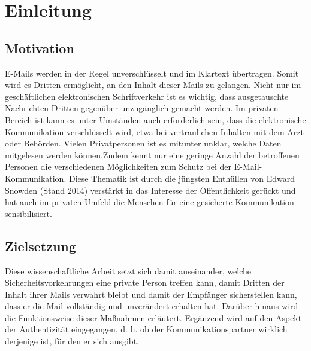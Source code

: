 \documentclass  [paper=a4,
				fontsize=12pt,
				listof=totoc,
				bibliography=totoc
				]{scrreprt}
\begin{document}
	\parindent 0pt %
	
	\pagebreak	%
  \pagestyle{plain}
  \tableofcontents
	\listoffigures %
	\pagebreak
	\listoftables %
	\pagebreak
	\pagebreak
	\setcounter{page}{1} %
		\pagestyle{fancyplain}
		\fancyhf{}							%
		\renewcommand{\headrulewidth}{0.4pt}
		\footskip =30pt
		\renewcommand{\chaptermark}[1]{\markboth{#1}{}}	%
		\rhead{\nouppercase{\leftmark}}	
		\cfoot{\thepage\ / \pageref{LastPage}}

\chapter{Einleitung}
		\section{Motivation}
		E-Mails werden in der Regel unverschlüsselt und im Klartext übertragen. Somit wird es Dritten ermöglicht, an den Inhalt dieser Mails zu gelangen. Nicht nur im geschäftlichen elektronischen Schriftverkehr ist es wichtig, dass ausgetauschte Nachrichten Dritten gegenüber unzugänglich gemacht werden. Im privaten Bereich ist kann es unter Umständen auch erforderlich sein, dass die elektronische Kommunikation verschlüsselt wird, etwa bei vertraulichen Inhalten mit dem Arzt oder Behörden. Vielen Privatpersonen ist es mitunter unklar, welche Daten mitgelesen werden können.Zudem kennt nur eine geringe Anzahl der betroffenen Personen die verschiedenen Möglichkeiten zum Schutz bei der E-Mail-Kommunikation. Diese Thematik ist durch die jüngsten Enthüllen von Edward Snowden (Stand 2014) verstärkt in das Interesse der Öffentlichkeit gerückt und hat auch im privaten Umfeld die Menschen für eine gesicherte Kommunikation sensibilisiert.
		\section{Zielsetzung}
		Diese wissenschaftliche Arbeit setzt sich damit auseinander, welche Sicherheitsvorkehrungen eine private Person treffen kann, damit Dritten der Inhalt ihrer Mails verwahrt bleibt und damit der Empfänger sicherstellen kann, dass er die Mail vollständig und unverändert erhalten hat. Darüber hinaus wird die Funktionsweise dieser Maßnahmen erläutert. Ergänzend wird auf den Aspekt der Authentizität eingegangen, d. h. ob der Kommunikationspartner wirklich derjenige ist, für den er sich ausgibt.
		
\end{document}
